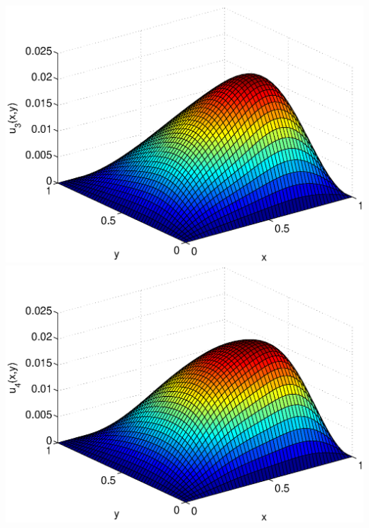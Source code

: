 \begin{solution}
\begin{enumerate}
\begin{center}
          \includegraphics[scale=0.37]{twoD3}\quad
          \includegraphics[scale=0.37]{twoD4}


\end{center}
\end{enumerate}
\end{solution}
